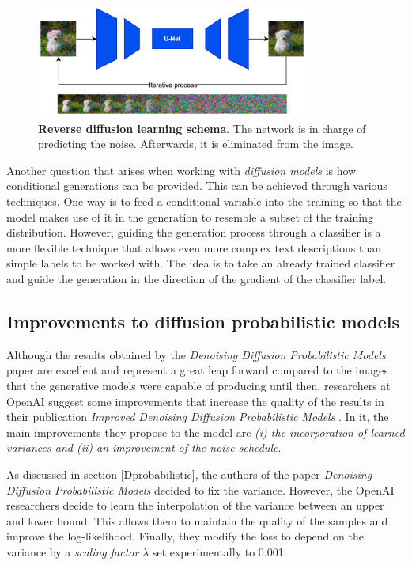 \begin{figure}
    \centering
    \includegraphics[width=0.8\textwidth]{Pictures/ReverseDP.png} 
    \caption{\textbf{Reverse diffusion learning schema}. The network is in charge of predicting the noise. Afterwards, it is eliminated from the image.}
    \label{fig:ReverseDP}
\end{figure}

Another question that arises when working with \textit{diffusion models} is how conditional generations can be provided. This can be achieved through various techniques. One way is to feed a conditional variable into the training so that the model makes use of it in the generation to resemble a subset of the training distribution. However, guiding the generation process through a classifier is a more flexible technique that allows even more complex text descriptions than simple labels to be worked with. The idea is to take an already trained classifier and guide the generation in the direction of the gradient of the classifier label.

\subsection{Improvements to diffusion probabilistic models }

Although the results obtained by the \textit{Denoising Diffusion Probabilistic Models} \cite{ho2020denoising} paper are excellent and represent a great leap forward compared to the images that the generative models were capable of producing until then, researchers at OpenAI suggest some improvements that increase the quality of the results in their publication \textit{Improved Denoising Diffusion Probabilistic Models} \cite{nichol2021improved}. In it, the main improvements they propose to the model are \textit{(i) the incorporation of learned variances and (ii) an improvement of the noise schedule}. 

As discussed in section \ref{Dprobabilistic}, the authors of the paper \textit{Denoising Diffusion Probabilistic Models} \cite{ho2020denoising} decided to fix the variance. However, the OpenAI researchers decide to learn the interpolation of the variance between an upper and lower bound. This allows them to maintain the quality of the samples and improve the log-likelihood. Finally, they modify the loss to depend on the variance by a \textit{scaling factor} $\lambda$ set experimentally to 0.001.


